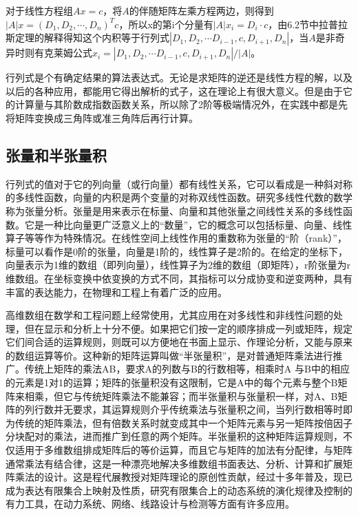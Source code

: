 	对于线性方程组$  Ax = c $，将$ A $的伴随矩阵左乘方程两边，则得到$ |A|x = (D_1, D_2, \cdots,D_n)^Tc $，所以x的第i个分量有$ |A|x_i = D_i\cdot c $，由6.2节中拉普拉斯定理的解释得知这个内积等于行列式$ |D_1, D_2,\cdots D_{i-1},c,D_{i+1},D_n| $，当$ A $是非奇异时则有克莱姆公式$ x_i=|D_1, D_2, \cdots D_{i-1},c,D_{i+1},D_n|/|A| $。
	
	行列式是个有确定结果的算法表达式。无论是求矩阵的逆还是线性方程的解，以及以后的各种应用，都能用它得出解析的式子，这在理论上有很大意义。但是由于它的计算量与其阶数成指数函数关系，所以除了2阶等极端情况外，在实践中都是先将矩阵变换成三角阵或准三角阵后再行计算。
	
	\subsection{张量和半张量积}
	
	行列式的值对于它的列向量（或行向量）都有线性关系，它可以看成是一种斜对称的多线性函数，向量的内积是两个变量的对称双线性函数。研究多线性代数的数学称为张量分析。张量是用来表示在标量、向量和其他张量之间线性关系的多线性函数。它是一种比向量更广泛意义上的“数量”，它的概念可以包括标量、向量、线性算子等等作为特殊情况。在线性空间上线性作用的重数称为张量的“阶（rank）”，标量可以看作是0阶的张量，向量是1阶的，线性算子是2阶的。在给定的坐标下，向量表示为1维的数组（即列向量），线性算子为2维的数组（即矩阵），r阶张量为r维数组。在坐标变换中依变换的方式不同，其指标可以分成协变和逆变两种，具有丰富的表达能力，在物理和工程上有着广泛的应用。
	
	高维数组在数学和工程问题上经常使用，尤其应用在对多线性和非线性问题的处理，但在显示和分析上十分不便。如果把它们按一定的顺序排成一列或矩阵，规定它们间合适的运算规则，则既可以方便地在书面上显示、作理论分析，又能与原来的数组运算等价。这种新的矩阵运算叫做“半张量积”，是对普通矩阵乘法进行推广。传统上矩阵的乘法AB，要求A的列数与B的行数相等，相乘时A 与B中的相应的元素是1对1的运算；矩阵的张量积没有这限制，它是A中的每个元素与整个B矩阵来相乘，但它与传统矩阵乘法不能兼容；而半张量积与张量积一样，对A、B矩阵的列行数并无要求，其运算规则介乎传统乘法与张量积之间，当列行数相等时即为传统的矩阵乘法，但有倍数关系时就变成其中一个矩阵元素与另一矩阵按倍因子分块配对的乘法，进而推广到任意的两个矩阵。半张量积的这种矩阵运算规则，不仅适用于多维数组排成矩阵后的等价运算，而且它与矩阵的加法有分配律，与矩阵通常乘法有结合律，这是一种漂亮地解决多维数组书面表达、分析、计算和扩展矩阵乘法的设计。这是程代展教授对矩阵理论的原创性贡献，经过十多年普及，现已成为表达有限集合上映射及性质，研究有限集合上的动态系统的演化规律及控制的有力工具，在动力系统、网络、线路设计与检测等方面有许多应用。\\
	
